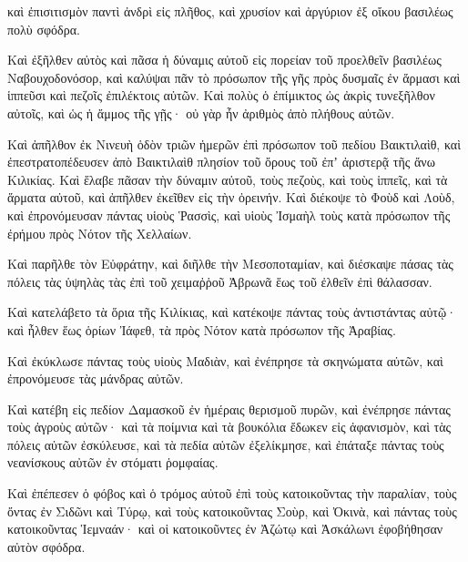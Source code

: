 {καὶ ἐπισιτισμὸν παντὶ ἀνδρὶ εἰς πλῆθος, καὶ χρυσίον καὶ ἀργύριον ἐξ οἴκου βασιλέως πολὺ σφόδρα.
\par }{\PP {}Καὶ ἐξῆλθεν αὐτὸς καὶ πᾶσα ἡ δύναμις αὐτοῦ εἰς πορείαν τοῦ προελθεῖν βασιλέως Ναβουχοδονόσορ, καὶ καλύψαι πᾶν τὸ πρόσωπον τῆς γῆς πρὸς δυσμαῖς ἐν ἅρμασι καὶ ἱππεῦσι καὶ πεζοῖς ἐπιλέκτοις αὐτῶν.
Καὶ πολὺς ὁ ἐπίμικτος ὡς ἀκρὶς τυνεξῆλθον αὐτοῖς, καὶ ὡς ἡ ἄμμος τῆς γῇς· οὐ γὰρ ἦν ἀριθμὸς ἀπὸ πλήθους αὐτῶν.
\par }{\PP {}Καὶ ἀπῆλθον ἐκ Νινευὴ ὁδὸν τριῶν ἡμερῶν ἐπὶ πρόσωπον τοῦ πεδίου Βαικτιλαὶθ, καὶ ἐπεστρατοπέδευσεν ἀπὸ Βαικτιλαὶθ πλησίον τοῦ ὄρους τοῦ ἐπʼ ἀριστερᾷ τῆς ἄνω Κιλικίας.
Καὶ ἔλαβε πᾶσαν τὴν δύναμιν αὐτοῦ, τοὺς πεζοὺς, καὶ τοὺς ἱππεῖς, καὶ τὰ ἅρματα αὐτοῦ, καὶ ἀπῆλθεν ἐκεῖθεν εἰς τὴν ὀρεινήν.
Καὶ διέκοψε τὸ Φοὺδ καὶ Λοὺδ, καὶ ἐπρονόμευσαν πάντας υἱοὺς Ῥασσὶς, καὶ υἱοὺς Ἰσμαὴλ τοὺς κατὰ πρόσωπον τῆς ἐρήμου πρὸς Νότον τῆς Χελλαίων.
\par }{\PP {}Καὶ παρῆλθε τὸν Εὐφράτην, καὶ διῆλθε τὴν Μεσοποταμίαν, καὶ διέσκαψε πάσας τὰς πόλεις τὰς ὑψηλὰς τὰς ἐπὶ τοῦ χειμαῤῥοῦ Ἀβρωνᾶ ἕως τοῦ ἐλθεῖν ἐπὶ θάλασσαν.
\par }{\PP {}Καὶ κατελάβετο τὰ ὅρια τῆς Κιλίκιας, καὶ κατέκοψε πάντας τοὺς ἀντιστάντας αὐτῷ· καὶ ἦλθεν ἕως ὁρίων Ἰάφεθ, τὰ πρὸς Νότον κατὰ πρόσωπον τῆς Ἀραβίας.
\par }{\PP {}Καὶ ἐκύκλωσε πάντας τοὺς υἱοὺς Μαδιὰν, καὶ ἐνέπρησε τὰ σκηνώματα αὐτῶν, καὶ ἐπρονόμευσε τὰς μάνδρας αὐτῶν.
\par }{\PP {}Καὶ κατέβη εἰς πεδίον Δαμασκοῦ ἐν ἡμέραις θερισμοῦ πυρῶν, καὶ ἐνέπρησε πάντας τοὺς ἀγροὺς αὐτῶν· καὶ τὰ ποίμνια καὶ τὰ βουκόλια ἔδωκεν εἰς ἀφανισμὸν, καὶ τὰς πόλεις αὐτῶν ἐσκύλευσε, καὶ τὰ πεδία αὐτῶν ἐξελίκμησε, καὶ ἐπάταξε πάντας τοὺς νεανίσκους αὐτῶν ἐν στόματι ῥομφαίας.
\par }{\PP {}Καὶ ἐπέπεσεν ὁ φόβος καὶ ὁ τρόμος αὐτοῦ ἐπὶ τοὺς κατοικοῦντας τὴν παραλίαν, τοὺς ὄντας ἐν Σιδῶνι καὶ Τύρῳ, καὶ τοὺς κατοικοῦντας Σοὺρ, καὶ Ὀκινὰ, καὶ πάντας τοὺς κατοικοῦντας Ἱεμναάν· καὶ οἱ κατοικοῦντες ἐν Ἀζώτῳ καὶ Ἀσκάλωνι ἐφοβήθησαν αὐτὸν σφόδρα.

}
